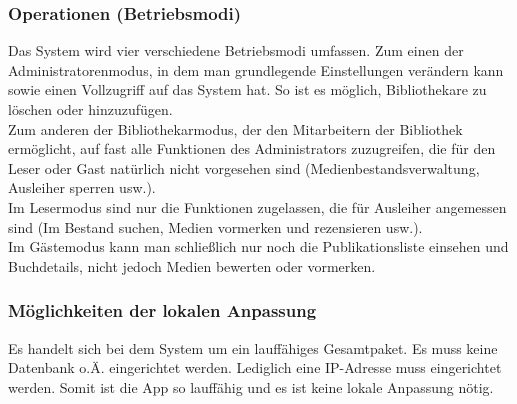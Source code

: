 \documentclass[fontsize=12pt,paper=a4,twoside]{scrartcl}
\begin{document}
\subsubsection{Operationen (Betriebsmodi)} \label{subsubsec:Operationen} Das System wird vier verschiedene Betriebsmodi umfassen. Zum einen der Administratorenmodus, in dem man grundlegende Einstellungen verändern kann sowie einen Vollzugriff auf das System hat. So ist es möglich, Bibliothekare zu löschen oder hinzuzufügen.\\
Zum anderen der Bibliothekarmodus, der den Mitarbeitern der Bibliothek ermöglicht, auf fast alle Funktionen des Administrators zuzugreifen, die für den Leser oder Gast natürlich nicht vorgesehen sind (Medienbestandsverwaltung, Ausleiher sperren usw.).\\
Im Lesermodus sind nur die Funktionen zugelassen, die für Ausleiher angemessen sind (Im Bestand suchen, Medien vormerken und rezensieren usw.).\\
Im Gästemodus kann man schließlich nur noch die Publikationsliste einsehen und Buchdetails, nicht jedoch Medien bewerten oder vormerken.

\subsubsection{Möglichkeiten der lokalen Anpassung} \label{subsubsec:LokaleAnpassung} Es handelt sich bei dem System um ein lauffähiges Gesamtpaket. Es muss keine Datenbank o.Ä. eingerichtet werden. Lediglich eine IP-Adresse muss eingerichtet werden. Somit ist die App so lauffähig und es ist keine lokale Anpassung nötig.
\end{document}

